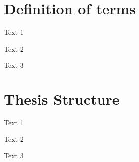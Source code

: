 \section{Definition of terms}\label{sec: i3}
Text 1

Text 2

Text 3

\section{Thesis Structure}\label{sec: i4}
Text 1

Text 2

Text 3